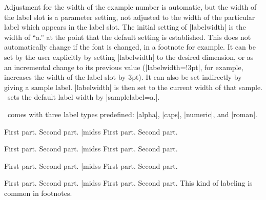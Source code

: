\exdisplay
\makeatletter
\vrule height1.6em depth3.5em width0pt
%
\xe
Adjustment for the width of the example number is automatic, but
the width of the label slot is a parameter setting, not adjusted
to the width of the particular label which appears in the label
slot.  The initial setting of |labelwidth| is the width of ``a.''
at the point that the default setting is established.  This does
not automatically change if the font is changed, in a footnote
for example.  It can be set by the user explicitly by setting
|labelwidth| to the desired dimension, or as an incremental
change to its previous value (|labelwidth=!3pt|, for example,
increases the width of the label slot by 3pt).  It can also be
set indirectly by giving a sample label.  |labelwidth| is then
set to the current width of that sample.  \ExPex\ sets the
default label width by |samplelabel=a.|.

\ExPex\ comes with three label types predefined: |alpha|,
|caps|, |numeric|, and |roman|.

\beginss
\pex[labeltype=alpha]
\a First part.
\a Second part.
\xe |midss
\pex[labeltype=alpha]
\a First part.
\a Second part.
\xe
\endss

\beginss
\pex[labeltype=caps]
\a First part.
\a Second part.
\xe |midss
\pex[labeltype=caps]
\a First part.
\a Second part.
\xe
\endss

\beginss
\pex[labeltype=numeric]
\a First part.
\a Second part.
\xe |midss
\pex[labeltype=numeric]
\a First part.
\a Second part.
\xe
\endss

\beginss
\pex[labeltype=roman]
\a First part.
\a Second part.
\xe |midss
\pex[labeltype=roman]
\a First part.
\a Second part.
\xe
\endss
This kind of labeling is common in footnotes.

